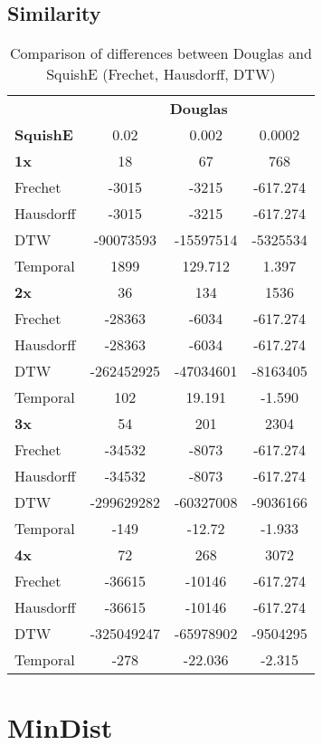 \subsection{Similarity}
\begin{table}[htbp]
	\centering
	\label{tab:douglas_vs_squish_comparison}
	\begin{tabular}{@{}lccc@{}}
		\toprule
		& \multicolumn{3}{c}{\textbf{Douglas}} \\
		\cmidrule(l){2-4}
		\textbf{SquishE} & 0.02 & 0.002 & 0.0002 \\
		\midrule
		\textbf{1x} 	& 18 	& 67 & 768 \\
		Frechet 		& -3015 & -3215 & -617.274 \\
		Hausdorff 		& -3015 	& -3215 & -617.274 \\
		DTW 			& -90073593 	& -15597514 & -5325534 \\
		Temporal 		& 1899 	& 129.712 & 1.397 \\ \midrule
		\textbf{2x} 	& 36 & 134 & 1536 \\
		Frechet 		& -28363 & -6034 & -617.274 \\
		Hausdorff 		& -28363 & -6034 & -617.274 \\
		DTW  		& -262452925 & -47034601 & -8163405 \\
		Temporal 	& 102 & 19.191 & -1.590 \\ \midrule
		\textbf{3x} 	& 54 & 201 & 2304 \\
		Frechet 		& -34532 & -8073 & -617.274 \\
		Hausdorff 		& -34532 & -8073 & -617.274 \\
		DTW 		& -299629282 & -60327008 & -9036166 \\
		Temporal 			& -149 & -12.72 & -1.933 \\ \midrule
		\textbf{4x} 	& 72 & 268 & 3072 \\
		Frechet 		& -36615 & -10146 & -617.274 \\
		Hausdorff 		& -36615 & -10146 & -617.274 \\
		DTW 		& -325049247 & -65978902 & -9504295 \\
		Temporal 			& -278 & -22.036 & -2.315 \\
		\bottomrule
	\end{tabular}
	\caption{Comparison of differences between Douglas and SquishE (Frechet, Hausdorff, DTW)}
\end{table}

\section{MinDist}

